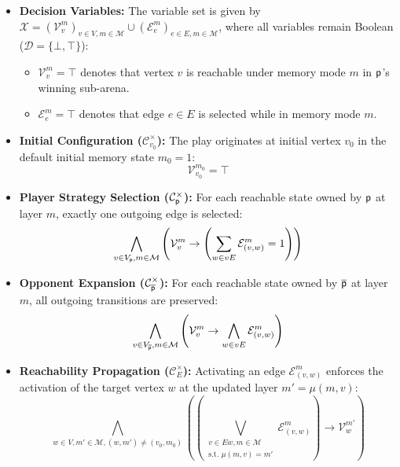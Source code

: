 \documentclass{article}
\begin{document}
\begin{itemize}
    \item \textbf{Decision Variables:} The variable set is given by $\mathcal{X} = (\mathcal{V}^m_v)_{v \in V, m \in \mathcal{M}} \cup (\mathcal{E}^m_e)_{e \in E, m \in \mathcal{M}}$, where all variables remain Boolean ($\mathcal{D} = \{\bot, \top\}$):
    \begin{itemize}
        \item $\mathcal{V}^m_v = \top$ denotes that vertex $v$ is reachable under memory mode $m$ in $\mathsf{p}$'s winning sub-arena.
        \item $\mathcal{E}^m_e = \top$ denotes that edge $e \in E$ is selected while in memory mode $m$.
    \end{itemize}

    \item \textbf{Initial Configuration ($\mathcal{C}_{v_0}^\times$):} The play originates at initial vertex $v_0$ in the default initial memory state $m_0 = 1$:
    \begin{equation}
        \mathcal{V}^{m_0}_{v_0} = \top
    \end{equation}

    \item \textbf{Player Strategy Selection ($\mathcal{C}_{\mathsf{p}}^\times$):} For each reachable state owned by $\mathsf{p}$ at layer $m$, exactly one outgoing edge is selected:
    \begin{equation}
        \bigwedge_{v \in V_{\mathsf{p}}, m \in \mathcal{M}} \left( \mathcal{V}^m_v \to \left( \sum_{w \in vE} \mathcal{E}^m_{(v,w)} = 1 \right) \right)
    \end{equation}

    \item \textbf{Opponent Expansion ($\mathcal{C}_{\overline{\mathsf{p}}}^\times$):} For each reachable state owned by $\overline{\mathsf{p}}$ at layer $m$, all outgoing transitions are preserved:
    \begin{equation}
        \bigwedge_{v \in V_{\overline{\mathsf{p}}}, m \in \mathcal{M}} \left( \mathcal{V}^m_v \to \bigwedge_{w \in vE} \mathcal{E}^m_{(v,w)} \right)
    \end{equation}

    \item \textbf{Reachability Propagation ($\mathcal{C}_{\!E}^\times$):} Activating an edge $\mathcal{E}^m_{(v,w)}$ enforces the activation of the target vertex $w$ at the updated layer $m' = \mu(m, v)$:
    \begin{equation}
        \bigwedge_{w \in V, m' \in \mathcal{M}, (w, m') \neq (v_0, m_0)} \left( \left( \bigvee_{\substack{v \in Ew, m \in \mathcal{M} \\ \text{s.t. } \mu(m, v) = m'}} \mathcal{E}^m_{(v,w)} \right) \to \mathcal{V}^{m'}_w \right)
    \end{equation}
\end{itemize}
\end{document}
